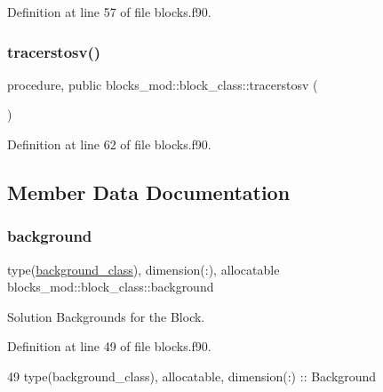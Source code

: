 Definition at line 57 of file blocks.\+f90.

\mbox{\label{structblocks__mod_1_1block__class_a5a0ac8b8f2440af5e52a7c4bc59be470}} 
\subsubsection{\texorpdfstring{tracerstosv()}{tracerstosv()}}
{\footnotesize\ttfamily procedure, public blocks\+\_\+mod\+::block\+\_\+class\+::tracerstosv (\begin{DoxyParamCaption}{ }\end{DoxyParamCaption})}



Definition at line 62 of file blocks.\+f90.



\subsection{Member Data Documentation}
\mbox{\label{structblocks__mod_1_1block__class_a774c07bf82d1392236abc81c285ea943}} 
\subsubsection{\texorpdfstring{background}{background}}
{\footnotesize\ttfamily type(\mbox{\hyperlink{structbackground__mod_1_1background__class}{background\+\_\+class}}), dimension(\+:), allocatable blocks\+\_\+mod\+::block\+\_\+class\+::background\hspace{0.3cm}{\ttfamily [private]}}



Solution Backgrounds for the Block. 



Definition at line 49 of file blocks.\+f90.


\begin{DoxyCode}
49         \textcolor{keywordtype}{type}(background\_class), \textcolor{keywordtype}{allocatable}, \textcolor{keywordtype}{dimension(:)} :: Background
\end{DoxyCode}
\mbox{\label{structblocks__mod_1_1block__class_aadfea105067472c254ff6b9d0ae9e723}} 
